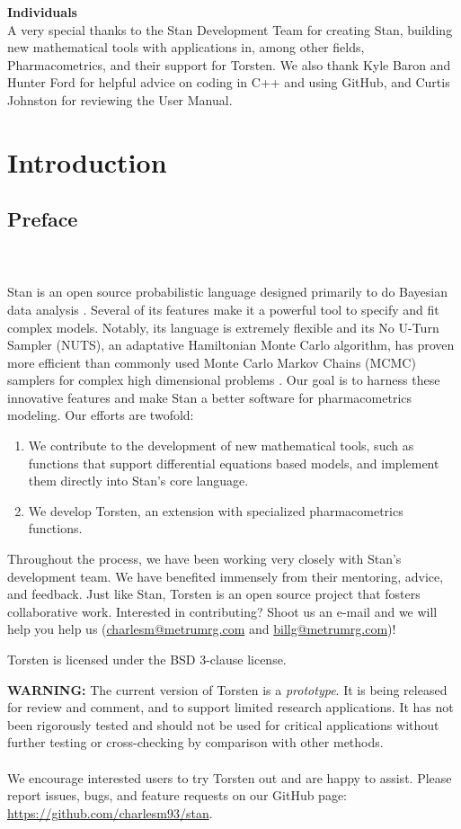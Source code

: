 \documentclass[11pt]{amsart}
\let\oldsection\section
\renewcommand\section{\clearpage\oldsection}
\newenvironment{fmpage}[1]
     {\begin{lrbox}{\fmbox}\begin{minipage}{#1}}
     {\end{minipage}\end{lrbox}\fbox{\usebox{\fmbox}}}
\begin{document}
{\bf Individuals} \ \\
A very special thanks to the Stan Development Team for creating Stan, building new mathematical tools with applications in, among other fields, Pharmacometrics, and their support for Torsten. We also thank Kyle Baron and Hunter Ford for helpful advice on coding in C++ and using GitHub, and Curtis Johnston for reviewing the User Manual. 

\section{Introduction}

\subsection{Preface} \ \\ \ \\ Stan is an open source probabilistic language designed primarily to do Bayesian data analysis \cite{stan}. Several of its features make it a powerful tool to specify and fit complex models. Notably, its language is extremely flexible and its No U-Turn Sampler (NUTS), an adaptative Hamiltonian Monte Carlo algorithm, has proven more efficient than commonly used Monte Carlo Markov Chains (MCMC) samplers for complex high dimensional problems \cite{nuts}. Our goal is to harness these innovative features and make Stan a better software for pharmacometrics modeling. Our efforts are twofold:
\begin{enumerate}
  \item We contribute to the development of new mathematical tools, such as functions that support differential equations based models, and implement them directly into Stan's core language.
  \item We develop Torsten, an extension with specialized pharmacometrics functions.
\end{enumerate}

Throughout the process, we have been working very closely with Stan's development team. We have benefited immensely from their mentoring, advice, and feedback. Just like Stan, Torsten is an open source project that fosters collaborative work. Interested in contributing? Shoot us an e-mail and we will help you help us (\url{charlesm@metrumrg.com} and \url{billg@metrumrg.com})!

Torsten is licensed under the BSD 3-clause license.

\begin{fmpage}{\textwidth}
{\bf WARNING:} The current version of Torsten is a {\em prototype}. It is being released for review and comment, and to support limited research applications. It has not been rigorously tested and should not be used for critical applications without further testing or cross-checking by comparison with other methods. \\ \ \\
We encourage interested users to try Torsten out and are happy to assist. Please report issues, bugs, and feature requests on our GitHub page: \url{https://github.com/charlesm93/stan}.
\end{fmpage}
\end{document}
